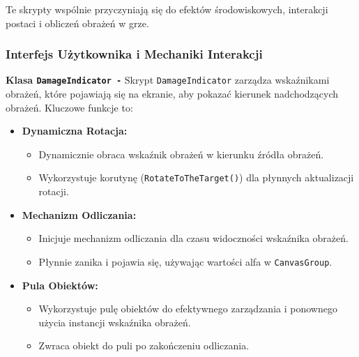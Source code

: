 Te skrypty wspólnie przyczyniają się do efektów środowiskowych, interakcji postaci i obliczeń obrażeń w grze.

\subsubsection{Interfejs Użytkownika i Mechaniki Interakcji}

\textbf{Klasa \texttt{DamageIndicator -}}
Skrypt \texttt{DamageIndicator} zarządza wskaźnikami obrażeń, które pojawiają się na ekranie, aby pokazać kierunek nadchodzących obrażeń. Kluczowe funkcje to:
\begin{itemize}
\item \textbf{Dynamiczna Rotacja:}
\begin{itemize}
\item Dynamicznie obraca wskaźnik obrażeń w kierunku źródła obrażeń.
\item Wykorzystuje korutynę (\texttt{RotateToTheTarget()}) dla płynnych aktualizacji rotacji.
\end{itemize}
\item \textbf{Mechanizm Odliczania:}
\begin{itemize}
\item Inicjuje mechanizm odliczania dla czasu widoczności wskaźnika obrażeń.
\item Płynnie zanika i pojawia się, używając wartości alfa w \texttt{CanvasGroup}.
\end{itemize}
\item \textbf{Pula Obiektów:}
\begin{itemize}
\item Wykorzystuje pulę obiektów do efektywnego zarządzania i ponownego użycia instancji wskaźnika obrażeń.
\item Zwraca obiekt do puli po zakończeniu odliczania.
\end{itemize}
\end{itemize}


